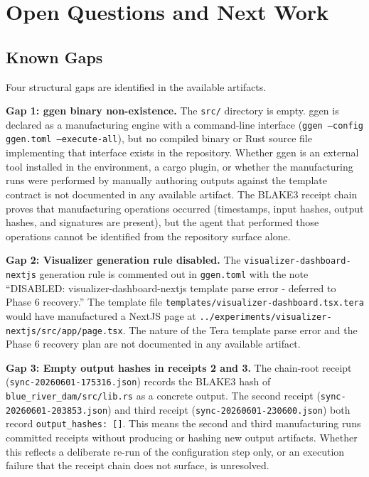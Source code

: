 
\section{Open Questions and Next Work}
\label{sec:ggen-open-questions}

\subsection{Known Gaps}
\label{sec:ggen-open-questions-gaps}

Four structural gaps are identified in the available artifacts.

\textbf{Gap 1: ggen binary non-existence.} The \texttt{src/} directory is empty. ggen is
declared as a manufacturing engine with a command-line interface (\texttt{ggen --config
ggen.toml --execute-all}), but no compiled binary or Rust source file implementing that interface
exists in the repository. Whether ggen is an external tool installed in the environment, a cargo
plugin, or whether the manufacturing runs were performed by manually authoring outputs against
the template contract is not documented in any available artifact. The BLAKE3 receipt chain
proves that manufacturing operations occurred (timestamps, input hashes, output hashes, and
signatures are present), but the agent that performed those operations cannot be identified from
the repository surface alone.

\textbf{Gap 2: Visualizer generation rule disabled.} The
\texttt{visualizer-dashboard-nextjs} generation rule is commented out in \texttt{ggen.toml} with
the note ``DISABLED: visualizer-dashboard-nextjs template parse error - deferred to Phase 6
recovery.'' The template file \texttt{templates/visualizer-dashboard.tsx.tera} would have
manufactured a NextJS page at
\texttt{../experiments/visualizer-nextjs/src/app/page.tsx}. The nature of the Tera template
parse error and the Phase 6 recovery plan are not documented in any available artifact.

\textbf{Gap 3: Empty output hashes in receipts 2 and 3.} The chain-root receipt
(\texttt{sync-20260601-175316.json}) records the BLAKE3 hash of \texttt{blue\_river\_dam/src/lib.rs}
as a concrete output. The second receipt (\texttt{sync-20260601-203853.json}) and third receipt
(\texttt{sync-20260601-230600.json}) both record \texttt{output\_hashes: []}. This means the
second and third manufacturing runs committed receipts without producing or hashing new output
artifacts. Whether this reflects a deliberate re-run of the configuration step only, or an
execution failure that the receipt chain does not surface, is unresolved.

